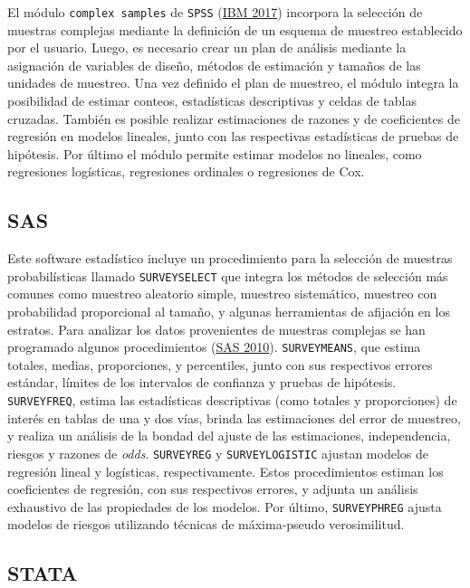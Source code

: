 \documentclass[
  12pt,
  spanish,
]{book}
\begin{document}
El módulo \texttt{complex\ samples} de \texttt{SPSS} (\protect\hyperlink{ref-IBM_2017}{IBM 2017}) incorpora la selección de muestras complejas mediante la definición de un esquema de muestreo establecido por el usuario. Luego, es necesario crear un plan de análisis mediante la asignación de variables de diseño, métodos de estimación y tamaños de las unidades de muestreo. Una vez definido el plan de muestreo, el módulo integra la posibilidad de estimar conteos, estadísticas descriptivas y celdas de tablas cruzadas. También es posible realizar estimaciones de razones y de coeficientes de regresión en modelos lineales, junto con las respectivas estadísticas de pruebas de hipótesis. Por último el módulo permite estimar modelos no lineales, como regresiones logísticas, regresiones ordinales o regresiones de Cox.

\hypertarget{sas}{%
\subsection*{SAS}\label{sas}}

Este software estadístico incluye un procedimiento para la selección de muestras probabilísticas llamado \texttt{SURVEYSELECT} que integra los métodos de selección más comunes como muestreo aleatorio simple, muestreo sistemático, muestreo con probabilidad proporcional al tamaño, y algunas herramientas de afijación en los estratos. Para analizar los datos provenientes de muestras complejas se han programado algunos procedimientos (\protect\hyperlink{ref-SAS_2017}{SAS 2010}). \texttt{SURVEYMEANS}, que estima totales, medias, proporciones, y percentiles, junto con sus respectivos errores estándar, límites de los intervalos de confianza y pruebas de hipótesis. \texttt{SURVEYFREQ}, estima las estadísticas descriptivas (como totales y proporciones) de interés en tablas de una y dos vías, brinda las estimaciones del error de muestreo, y realiza un análisis de la bondad del ajuste de las estimaciones, independencia, riesgos y razones de \emph{odds}. \texttt{SURVEYREG} y \texttt{SURVEYLOGISTIC} ajustan modelos de regresión lineal y logísticas, respectivamente. Estos procedimientos estiman los coeficientes de regresión, con sus respectivos errores, y adjunta un análisis exhaustivo de las propiedades de los modelos. Por último, \texttt{SURVEYPHREG} ajusta modelos de riesgos utilizando técnicas de máxima-pseudo verosimilitud.

\hypertarget{stata}{%
\subsection*{STATA}\label{stata}}
\end{document}
